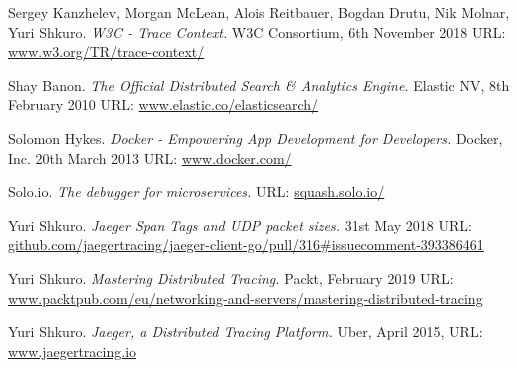 \documentclass[12pt,pdftex,titlepage]{report}
\begin{document}
\begin{small}
\begin{thebibliography}{69}
        Sergey Kanzhelev, Morgan McLean, Alois Reitbauer, Bogdan Drutu, Nik Molnar, Yuri Shkuro. \textit{W3C - Trace Context.}
        W3C Consortium, 6th November 2018
        {\scriptsize URL:} \url{www.w3.org/TR/trace-context/}

        Shay Banon. \textit{The Official Distributed Search \& Analytics Engine.}
        Elastic NV, 8th February 2010
        {\scriptsize URL:} \url{www.elastic.co/elasticsearch/}

        Solomon Hykes. \textit{Docker - Empowering App Development for Developers.}
        Docker, Inc. 20th March 2013
        {\scriptsize URL:} \url{www.docker.com/}

        Solo.io. \textit{The debugger for microservices.}
        {\scriptsize URL:} \url{squash.solo.io/}

        Yuri Shkuro. \textit{Jaeger Span Tags and UDP packet sizes.}
        31st May 2018
        {\scriptsize URL:} \url{github.com/jaegertracing/jaeger-client-go/pull/316#issuecomment-393386461}

        Yuri Shkuro. \textit{Mastering Distributed Tracing.}
        Packt, February 2019
        {\scriptsize URL:} \url{www.packtpub.com/eu/networking-and-servers/mastering-distributed-tracing}

        Yuri Shkuro. \textit{Jaeger, a Distributed Tracing Platform.}
        Uber, April 2015, {\scriptsize URL:} \url{www.jaegertracing.io}
    \end{thebibliography}
    \end{small}
\end{document}
